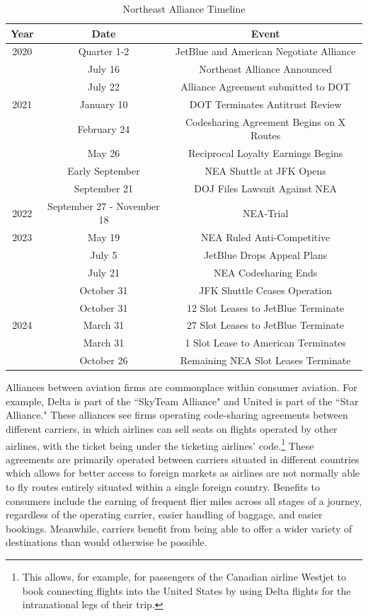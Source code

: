 \documentclass{article}
\begin{document}
    \begin{table}[tb]
		\caption{Northeast Alliance Timeline}
		\label{tab:NEA_Timeline}
		\begin{center}
			\begin{tabular}{ccc}
				\hline
				Year & Date & Event \\
				\hline
				2020 & Quarter 1-2 & JetBlue and American Negotiate Alliance \\ 
				& July 16 & Northeast Alliance Announced \\
				& July 22 & Alliance Agreement submitted to DOT \\
				\hline 
				2021 & January 10 & DOT Terminates Antitrust Review \\
				& February 24 & Codesharing Agreement Begins on {X} Routes \\
				& May 26 & Reciprocal Loyalty Earnings Begins \\
				& Early September & NEA Shuttle at JFK Opens \\
				& September 21 & DOJ Files Lawsuit Against NEA \\  
				\hline
				2022 & September 27 - November 18 & NEA-Trial \\
				\hline 
				2023 & May 19 & NEA Ruled Anti-Competitive \\
				& July 5 & JetBlue Drops Appeal Plans \\
				& July 21 & NEA Codesharing Ends \\
				& October 31 & JFK Shuttle Ceases Operation\\
				& October 31 & 12 Slot Leases to JetBlue Terminate \\
				\hline 
				2024 &  March 31  & 27 Slot Leases to JetBlue Terminate \\ 
				& March 31 & 1 Slot Lease to American Terminates \\
				& October 26 & Remaining NEA Slot Leases Terminate				 \end{tabular}
		\end{center}
	\end{table}

	
	Alliances between aviation firms are commonplace within consumer aviation. For example, Delta is part of the ``SkyTeam Alliance" and United is part of the ``Star Alliance." These alliances see firms operating code-sharing agreements between different carriers, in which airlines can sell seats on flights operated by other airlines, with the ticket being under the ticketing airlines' code.\footnote{This allows, for example, for passengers of the Canadian airline Westjet to book connecting flights into the United States by using Delta flights for the intranational legs of their trip.}  These agreements are primarily operated between carriers situated in different countries which allows for better access to foreign markets as airlines are not normally able to fly routes entirely situated within a single foreign country. Benefits to consumers include the earning of frequent flier miles across all stages of a journey, regardless of the operating carrier, easier handling of baggage, and easier bookings. Meanwhile, carriers benefit from being able to offer a wider variety of destinations than would otherwise be possible.
	
\end{document}
